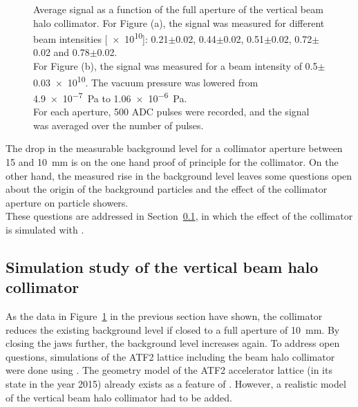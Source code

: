 \begin{figure}
\caption[RHUL Cherenkov detector signal vs. collimator aperture]{
Average signal as a function of the full aperture of the vertical beam halo collimator. 
For Figure (a), the signal was measured for different beam intensities [\num[detect-all]{e10}]: 0.21$\pm$0.02, 0.44$\pm$0.02, 0.51$\pm$0.02, 0.72$\pm$0.02 and 0.78$\pm$0.02. 
\\For Figure (b), the signal was measured for a beam intensity of \num[detect-all]{0.5}$\pm$\num[detect-all]{0.03e10}. 
The vacuum pressure was lowered from \SI[detect-all]{4.9e-7}{\pascal} to \SI[detect-all]{1.06e-6}{\pascal}. 
\\For each aperture, 500 ADC pulses were recorded, and the signal was averaged over the number of pulses.}
\label{fig:AverageSignal_Aperture_Symmetric}
\end{figure}

The drop in the measurable background level for a collimator aperture between 15 and \SI{10}{\milli\metre} is on the one hand proof of principle for the collimator.
On the other hand, the measured rise in the background level leaves some questions open about the origin of the background particles and the effect of the collimator aperture on particle showers.
\\These questions are addressed in Section~\ref{sec:BDSIM_sim}, in which the effect of the collimator is simulated with \bdsim.

\subsection{Simulation study of the vertical beam halo collimator}
\label{sec:BDSIM_sim}
As the data in Figure~\ref{fig:AverageSignal_Aperture_Symmetric} in the previous section have shown, the collimator reduces the existing background level if closed to a full aperture of \SI{10}{\milli\metre}. 
By closing the jaws further, the background level increases again.
To address open questions, simulations of the ATF2 lattice including the beam halo collimator were done using \bdsim.
The geometry model of the ATF2 accelerator lattice (in its state in the year 2015) already exists as a feature of \bdsim.
However, a realistic model of the vertical beam halo collimator had to be added.

